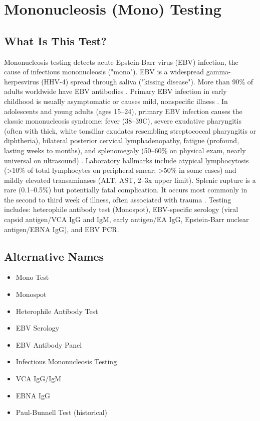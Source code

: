 \chapter{Mononucleosis (Mono) Testing}

\section*{What Is This Test?}
Mononucleosis testing detects acute Epstein-Barr virus (EBV) infection, the cause of infectious mononucleosis ("mono"). EBV is a widespread gamma-herpesvirus (HHV-4) spread through saliva ("kissing disease"). More than 90\% of adults worldwide have EBV antibodies \cite{cohen2000epstein}. Primary EBV infection in early childhood is usually asymptomatic or causes mild, nonspecific illness \cite{dunmire2018primary}. In adolescents and young adults (ages 15--24), primary EBV infection causes the classic mononucleosis syndrome: fever (38--39\textdegree{}C), severe exudative pharyngitis (often with thick, white tonsillar exudates resembling streptococcal pharyngitis or diphtheria), bilateral posterior cervical lymphadenopathy, fatigue (profound, lasting weeks to months), and splenomegaly (50--60\% on physical exam, nearly universal on ultrasound) \cite{ebell2004epstein}. Laboratory hallmarks include atypical lymphocytosis (>10\% of total lymphocytes on peripheral smear; >50\% in some cases) and mildly elevated transaminases (ALT, AST, 2--3x upper limit). Splenic rupture is a rare (0.1--0.5\%) but potentially fatal complication. It occurs most commonly in the second to third week of illness, often associated with trauma \cite{luzuriaga2010infectious}. Testing includes: heterophile antibody test (Monospot), EBV-specific serology (viral capsid antigen/VCA IgG and IgM, early antigen/EA IgG, Epstein-Barr nuclear antigen/EBNA IgG), and EBV PCR.

\section*{Alternative Names}
\begin{itemize}
  \item Mono Test
  \item Monospot
  \item Heterophile Antibody Test
  \item EBV Serology
  \item EBV Antibody Panel
  \item Infectious Mononucleosis Testing
  \item VCA IgG/IgM
  \item EBNA IgG
  \item Paul-Bunnell Test (historical)
\end{itemize}

